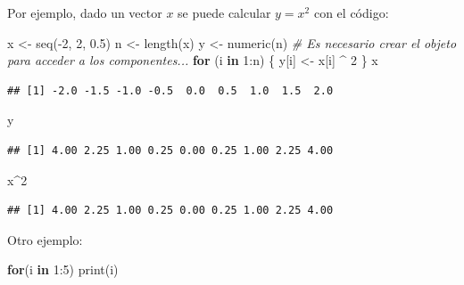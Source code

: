 \documentclass[
]{book}
\newenvironment{Shaded}{\begin{snugshade}}{\end{snugshade}}
\newcommand{\CommentTok}[1]{\textcolor[rgb]{0.56,0.35,0.01}{\textit{#1}}}
\newcommand{\ControlFlowTok}[1]{\textcolor[rgb]{0.13,0.29,0.53}{\textbf{#1}}}
\newcommand{\DecValTok}[1]{\textcolor[rgb]{0.00,0.00,0.81}{#1}}
\newcommand{\FloatTok}[1]{\textcolor[rgb]{0.00,0.00,0.81}{#1}}
\newcommand{\FunctionTok}[1]{\textcolor[rgb]{0.00,0.00,0.00}{#1}}
\newcommand{\NormalTok}[1]{#1}
\newcommand{\OtherTok}[1]{\textcolor[rgb]{0.56,0.35,0.01}{#1}}
\newcommand{\SpecialCharTok}[1]{\textcolor[rgb]{0.00,0.00,0.00}{#1}}
\theoremstyle{break}
\theoremstyle{nonumberplain}
\begin{document}
Por ejemplo, dado un vector \(x\) se puede calcular \(y=x^2\) con el código:

\begin{Shaded}
\begin{Highlighting}[]
\NormalTok{x }\OtherTok{\textless{}{-}} \FunctionTok{seq}\NormalTok{(}\SpecialCharTok{{-}}\DecValTok{2}\NormalTok{, }\DecValTok{2}\NormalTok{, }\FloatTok{0.5}\NormalTok{)}
\NormalTok{n }\OtherTok{\textless{}{-}} \FunctionTok{length}\NormalTok{(x)}
\NormalTok{y }\OtherTok{\textless{}{-}} \FunctionTok{numeric}\NormalTok{(n) }\CommentTok{\# Es necesario crear el objeto para acceder a los componentes...}
\ControlFlowTok{for}\NormalTok{ (i }\ControlFlowTok{in} \DecValTok{1}\SpecialCharTok{:}\NormalTok{n) \{ y[i] }\OtherTok{\textless{}{-}}\NormalTok{ x[i] }\SpecialCharTok{\^{}} \DecValTok{2}\NormalTok{ \}}
\NormalTok{x}
\end{Highlighting}
\end{Shaded}

\begin{verbatim}
## [1] -2.0 -1.5 -1.0 -0.5  0.0  0.5  1.0  1.5  2.0
\end{verbatim}

\begin{Shaded}
\begin{Highlighting}[]
\NormalTok{y}
\end{Highlighting}
\end{Shaded}

\begin{verbatim}
## [1] 4.00 2.25 1.00 0.25 0.00 0.25 1.00 2.25 4.00
\end{verbatim}

\begin{Shaded}
\begin{Highlighting}[]
\NormalTok{x}\SpecialCharTok{\^{}}\DecValTok{2}
\end{Highlighting}
\end{Shaded}

\begin{verbatim}
## [1] 4.00 2.25 1.00 0.25 0.00 0.25 1.00 2.25 4.00
\end{verbatim}

Otro ejemplo:

\begin{Shaded}
\begin{Highlighting}[]
\ControlFlowTok{for}\NormalTok{(i }\ControlFlowTok{in} \DecValTok{1}\SpecialCharTok{:}\DecValTok{5}\NormalTok{) }\FunctionTok{print}\NormalTok{(i)}
\end{Highlighting}
\end{Shaded}
\end{document}
